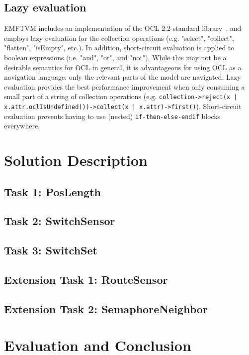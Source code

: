 \documentclass[submission,copyright,creativecommons]{eptcs}
\begin{document}
\subsection{Lazy evaluation}

EMFTVM includes an implementation of the OCL 2.2 standard library~\cite{omg/ocl22}, and employs lazy evaluation for the collection operations (e.g. "select", "collect", "flatten", "isEmpty", etc.). In addition, short-circuit evaluation is applied to boolean expressions (i.e. "and", "or", and "not"). While this may not be a desirable semantics for OCL in general, it is advantageous for using OCL as a navigation language: only the relevant parts of the model are navigated. Lazy evaluation provides the best performance improvement when only consuming a small part of a string of collection operations (e.g. \texttt{collection->reject(x | x.attr.oclIsUndefined())->collect(x | x.attr)->first()}). Short-circuit evaluation prevents having to use (nested) \texttt{if-then-else-endif} blocks everywhere.

\section{Solution Description}
\label{sec:solution}

\subsection{Task 1: PosLength}

\subsection{Task 2: SwitchSensor}

\subsection{Task 3: SwitchSet}

\subsection{Extension Task 1: RouteSensor}

\subsection{Extension Task 2: SemaphoreNeighbor}

\section{Evaluation and Conclusion}
\label{sec:eval}



\end{document}
